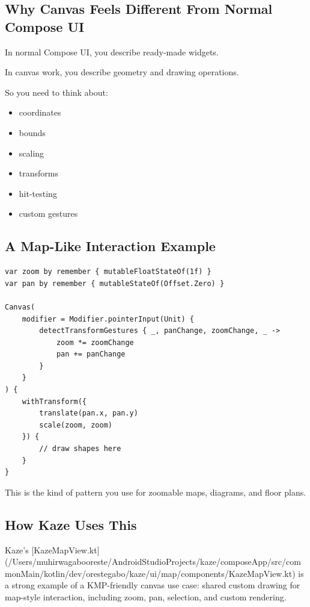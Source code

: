 \documentclass[11pt,a4paper]{article}
\begin{document}
\subsection{Why Canvas Feels Different From Normal Compose UI}

In normal Compose UI, you describe ready-made widgets.

In canvas work, you describe geometry and drawing operations.

So you need to think about:
\begin{itemize}
    \item coordinates
    \item bounds
    \item scaling
    \item transforms
    \item hit-testing
    \item custom gestures
\end{itemize}

\subsection{A Map-Like Interaction Example}

\begin{lstlisting}[style=kazekotlin]
var zoom by remember { mutableFloatStateOf(1f) }
var pan by remember { mutableStateOf(Offset.Zero) }

Canvas(
    modifier = Modifier.pointerInput(Unit) {
        detectTransformGestures { _, panChange, zoomChange, _ ->
            zoom *= zoomChange
            pan += panChange
        }
    }
) {
    withTransform({
        translate(pan.x, pan.y)
        scale(zoom, zoom)
    }) {
        // draw shapes here
    }
}
\end{lstlisting}

This is the kind of pattern you use for zoomable maps, diagrams, and floor plans.

\subsection{How Kaze Uses This}

Kaze's [KazeMapView.kt](/Users/muhirwagabooreste/AndroidStudioProjects/kaze/composeApp/src/commonMain/kotlin/dev/orestegabo/kaze/ui/map/components/KazeMapView.kt) is a strong example of a KMP-friendly canvas use case: shared custom drawing for map-style interaction, including zoom, pan, selection, and custom rendering.
\end{document}
